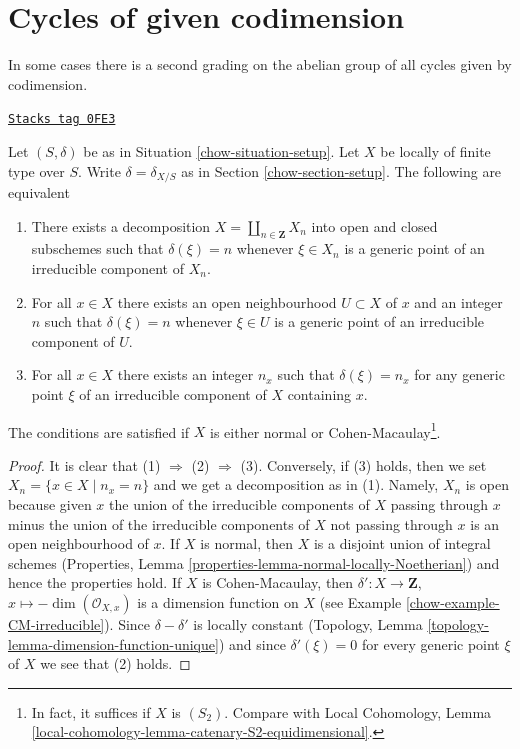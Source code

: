 \section{Cycles of given codimension}
\label{chow-section-cycles-codimension}
In some cases there is a second grading on the abelian group
of all cycles given by codimension.

\begin{lemma}
\label{chow-lemma-locally-equidimensional}
\href{https://stacks.math.columbia.edu/tag/0FE3}{\texttt{Stacks tag 0FE3}}

Let $(S, \delta)$ be as in Situation \ref{chow-situation-setup}.
Let $X$ be locally of finite type over $S$. Write
$\delta = \delta_{X/S}$ as in Section \ref{chow-section-setup}.
The following are equivalent
\begin{enumerate}
\item There exists a decomposition $X = \coprod_{n \in \mathbf{Z}} X_n$
into open and closed subschemes such that $\delta(\xi) = n$ whenever
$\xi \in X_n$ is a generic point of an irreducible component of $X_n$.
\item For all $x \in X$ there exists an open neighbourhood $U \subset X$
of $x$ and an integer $n$ such that $\delta(\xi) = n$ whenever
$\xi \in U$ is a generic point of an irreducible component of $U$.
\item For all $x \in X$ there exists an integer $n_x$ such that
$\delta(\xi) = n_x$ for any generic point $\xi$ of an irreducible
component of $X$ containing $x$.
\end{enumerate}
The conditions are satisfied if $X$ is either
normal or Cohen-Macaulay\footnote{In fact, it suffices if
$X$ is $(S_2)$. Compare with Local Cohomology, Lemma
\ref{local-cohomology-lemma-catenary-S2-equidimensional}.}.
\end{lemma}

\begin{proof}

It is clear that (1) $\Rightarrow$ (2) $\Rightarrow$ (3).
Conversely, if (3) holds, then we set $X_n = \{x \in X \mid n_x = n\}$
and we get a decomposition as in (1). Namely, $X_n$ is open because
given $x$ the union of the irreducible components of $X$ passing through $x$
minus the union of the irreducible components of $X$ not passing through $x$
is an open neighbourhood of $x$. If $X$ is normal, then $X$ is a
disjoint union of integral schemes
(Properties, Lemma \ref{properties-lemma-normal-locally-Noetherian})
and hence the properties hold.
If $X$ is Cohen-Macaulay, then
$\delta' : X \to \mathbf{Z}$, $x \mapsto -\dim(\mathcal{O}_{X, x})$
is a dimension function on $X$ (see Example \ref{chow-example-CM-irreducible}).
Since $\delta - \delta'$ is locally constant
(Topology, Lemma \ref{topology-lemma-dimension-function-unique})
and since $\delta'(\xi) = 0$ for every generic point $\xi$ of $X$
we see that (2) holds.
\end{proof}


